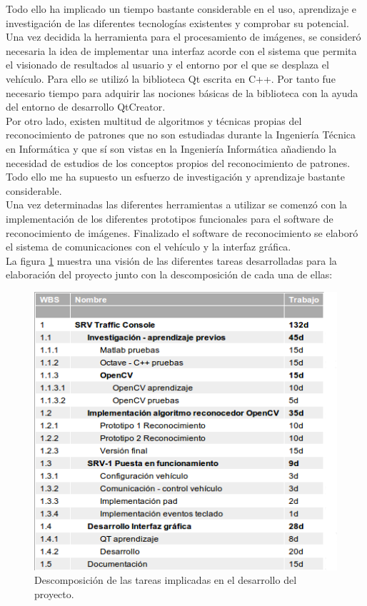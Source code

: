\documentclass[a4paper,12pt]{article}
\begin{document}
Todo ello ha implicado un tiempo bastante considerable en el uso, aprendizaje e investigación de las diferentes tecnologías existentes y comprobar su potencial.\\

Una vez decidida la herramienta para el procesamiento de imágenes, se consideró necesaria la idea de implementar una interfaz acorde con el sistema que permita el visionado de resultados al usuario y el entorno por el que se desplaza el vehículo. Para ello se utilizó la biblioteca Qt escrita en C++. Por tanto fue necesario tiempo para adquirir las nociones básicas de la biblioteca con la ayuda del entorno de desarrollo QtCreator.\\

Por otro lado, existen multitud de algoritmos y técnicas propias del reconocimiento de patrones que no son estudiadas durante la Ingeniería Técnica en Informática y que sí son vistas en la Ingeniería Informática añadiendo la necesidad de estudios de los conceptos propios del reconocimiento de patrones. Todo ello me ha supuesto un esfuerzo de investigación y aprendizaje bastante considerable.\\

Una vez determinadas las diferentes herramientas a utilizar se comenzó con la implementación de los diferentes prototipos funcionales para el software de reconocimiento de imágenes. Finalizado el software de reconocimiento se elaboró el sistema de comunicaciones con el vehículo y la interfaz gráfica.\\

La figura \ref{gantt:tareas} muestra una visión de las diferentes tareas desarrolladas para la elaboración del proyecto junto con la descomposición de cada una de ellas:\\

\begin{figure}[H]
  \begin{center}
    \includegraphics[scale=0.6]{imagenes/tareas-gantt.png}
  \end{center}
  \caption{Descomposición de las tareas implicadas en el desarrollo del proyecto.}
  \label{gantt:tareas}
\end{figure}
\end{document}
